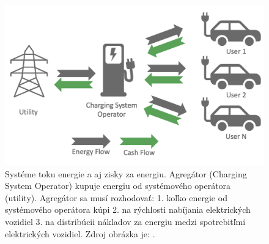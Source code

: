 \begin{figure}[H]
    \includegraphics[width=\textwidth]{images/energy_flow_costs.png}
    \centering
    \caption[Systém toku energie a ziskov.]{Systéme toku energie a aj zisky za energiu. Agregátor (Charging System Operator) kupuje energiu od systémového operátora (utility). Agregátor sa musí rozhodovať: 1. koľko energie od systémového operátora kúpi 2. na rýchlosti nabíjania elektrických vozidiel  3. na distribúcii nákladov za energiu medzi spotrebitľmi elektrických vozidiel. Zdroj obrázka je: \cite{websitpricecharging2023}.}
    \label{architectureacnsim:obr2}
    \end{figure}








